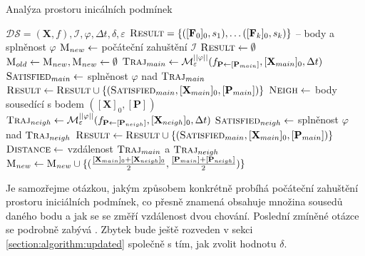 \begin{algorithm}
\label{algorithm:main:original}
\caption{Analýza prostoru inicálních podmínek}
\begin{algorithmic}[1]
\Require 	$\mathcal{DS} = (\mathbf{X}, f), \mathcal{I}, \varphi, \Delta t, \delta, \varepsilon$
\Ensure 	$\textsc{Result} = \{([\mathbf{F}_0]_0, s_1), \ldots ([\mathbf{F}_k]_0, s_k)\}$ -- body a splněnost $\varphi$
\State		$\textsc{M}_{new} 	\gets $ počáteční zahuštění $\mathcal{I}$
\State		$\textsc{Result} \gets \emptyset$
	\State $\textsc{M}_{old} \gets \textsc{M}_{new}, \textsc{M}_{new} \gets \emptyset$
		\State $\textsc{Traj}_{main} \gets \mathcal{M}^{||\varphi||}_\varepsilon(f_{\mathbf{P} \gets [\mathbf{P}_{main}]}, [\mathbf{X}_{main}]_0, \Delta t)$
		\State $\textsc{Satisfied}_{main} \gets $ splněnost $\varphi$ nad $\textsc{Traj}_{main}$
		\State $\textsc{Result} \gets \textsc{Result} \cup \{(\textsc{Satisfied}_{main}, [\mathbf{X}_{main}]_0, [\mathbf{P}_{main}])\}$
		\State $\textsc{Neigh} \gets $ body sousedící s bodem $([\mathbf{X}]_0, [\mathbf{P}])$
			\State $\textsc{Traj}_{neigh} \gets \mathcal{M}^{||\varphi||}_\varepsilon(f_{\mathbf{P} \gets [\mathbf{P}_{neigh}]}, [\mathbf{X}_{neigh}]_0, \Delta t)$
			\State $\textsc{Satisfied}_{neigh} \gets $ splněnost $\varphi$ nad $\textsc{Traj}_{neigh}$
			\State $\textsc{Result} \gets \textsc{Result} \cup \{(\textsc{Satisfied}_{main}, [\mathbf{X}_{main}]_0, [\mathbf{P}_{main}])\}$
			\State $\textsc{Distance} \gets $ vzdálenost $\textsc{Traj}_{main}$ a $\textsc{Traj}_{neigh}$\label{algorithm:line:trajectory:distance}
				\State	$\textsc{M}_{new} \gets \textsc{M}_{new} \cup \{(\frac{[\mathbf{X}_{main}]_0 + [\mathbf{X}_{neigh}]_0}{2}, \frac{[\mathbf{P}_{main}] + [\mathbf{P}_{neigh}]}{2})\}$
			\EndIf
		\EndFor
	\EndFor
\EndWhile
\end{algorithmic}
\end{algorithm}

Je samozřejme otázkou, jakým způsobem konkrétně probíhá počáteční zahuštění prostoru
iniciálních podmínek, co přesně znamená obsahuje mno\-žina sousedů daného bodu a jak
se se změří vzdálenost dvou chování. Poslední zmíněné otázce se podrobně zabývá \cite{drazan2011}.
Zbytek bude ještě rozveden v sekci \ref{section:algorithm:updated} společně s tím,
jak zvolit hodnotu $\delta$.

